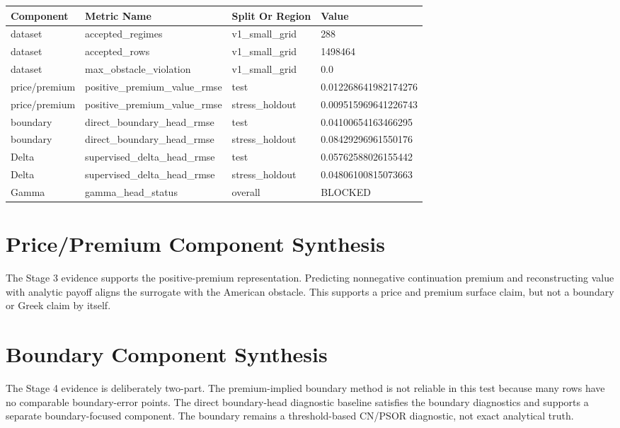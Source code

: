 \documentclass[11pt,a4paper]{article}
\begin{document}
\begin{longtable}{L{0.18\textwidth} L{0.32\textwidth} L{0.20\textwidth} L{0.20\textwidth}}
\toprule
Component & Metric Name & Split Or Region & Value \\
\midrule
\endhead
dataset & accepted\_regimes & v1\_small\_grid & 288 \\
dataset & accepted\_rows & v1\_small\_grid & 1498464 \\
dataset & max\_obstacle\_violation & v1\_small\_grid & 0.0 \\
price/premium & positive\_premium\_value\_rmse & test & 0.012268641982174276 \\
price/premium & positive\_premium\_value\_rmse & stress\_holdout & 0.009515969641226743 \\
boundary & direct\_boundary\_head\_rmse & test & 0.04100654163466295 \\
boundary & direct\_boundary\_head\_rmse & stress\_holdout & 0.08429296961550176 \\
Delta & supervised\_delta\_head\_rmse & test & 0.05762588026155442 \\
Delta & supervised\_delta\_head\_rmse & stress\_holdout & 0.04806100815073663 \\
Gamma & gamma\_head\_status & overall & BLOCKED \\
\bottomrule
\end{longtable}

\section{Price/Premium Component Synthesis}

The Stage 3 evidence supports the positive-premium representation. Predicting nonnegative
continuation premium and reconstructing value with analytic payoff aligns the surrogate with the
American obstacle. This supports a price and premium surface claim, but not a boundary or Greek
claim by itself.

\section{Boundary Component Synthesis}

The Stage 4 evidence is deliberately two-part. The premium-implied boundary method is not reliable
in this test because many rows have no comparable boundary-error points. The direct boundary-head
diagnostic baseline satisfies the boundary diagnostics and supports a separate boundary-focused
component. The boundary remains a threshold-based CN/PSOR diagnostic, not exact analytical truth.
\end{document}
